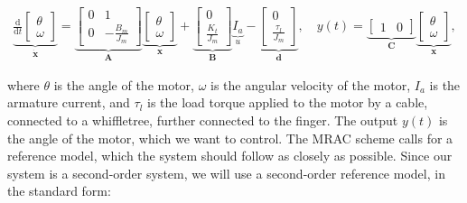 \begin{equation}
    \label{eq:controller_design_mrac_system_dynamics}
    \begin{aligned}
        \underbrace{
        \frac{\mathrm{d}}{\mathrm{d}t} \begin{bmatrix}
            \theta\\
            \omega
        \end{bmatrix}}_{\dot{\mathbf{x}}} = \underbrace{\begin{bmatrix}
            0 & 1 \\
            0 & -\frac{B_m}{J_m}
        \end{bmatrix}}_{\mathbf{A}}
        \underbrace{
        \begin{bmatrix}
            \theta\\
            \omega
        \end{bmatrix}}_{\mathbf{x}} + \underbrace{\begin{bmatrix}
            0 \\
            \frac{K_t}{J_m}
        \end{bmatrix}}_{\mathbf{B}} \underbrace{I_a}_{u} - \underbrace{\begin{bmatrix}
            0 \\
            \frac{\tau_l}{J_m}
        \end{bmatrix}}_{\mathbf{d}},
        \quad y(t) = \underbrace{\begin{bmatrix}
            1 & 0
        \end{bmatrix}}_{\mathbf{C}} \underbrace{\begin{bmatrix}
            \theta\\
            \omega
        \end{bmatrix}}_{\mathbf{x}},
    \end{aligned}
\end{equation}

where $\theta$ is the angle of the motor, $\omega$ is the angular velocity of the motor, $I_a$ is the armature current, and $\tau_l$ is the load torque applied to the motor by a cable, connected to a whiffletree, further connected to the finger. The output $y(t)$ is the angle of the motor, which we want to control. The MRAC scheme calls for a reference model, which the system should follow as closely as possible. Since our system is a second-order system, we will use a second-order reference model, in the standard form:

